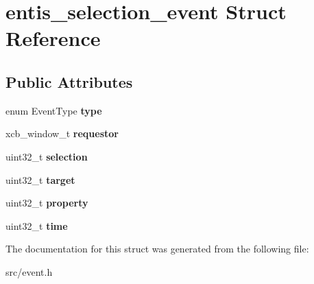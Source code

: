\hypertarget{structentis__selection__event}{}\section{entis\+\_\+selection\+\_\+event Struct Reference}
\label{structentis__selection__event}
\subsection*{Public Attributes}
\begin{DoxyCompactItemize}
\item 
\mbox{\label{structentis__selection__event_a4ea19c642e36c6e18c28fd62271503f9}} 
enum Event\+Type {\bfseries type}
\item 
\mbox{\label{structentis__selection__event_a84947ae6c0fd21f81d68be1622b4fd64}} 
xcb\+\_\+window\+\_\+t {\bfseries requestor}
\item 
\mbox{\label{structentis__selection__event_a1a3a4a9427cd1ede59b33b480749e19a}} 
uint32\+\_\+t {\bfseries selection}
\item 
\mbox{\label{structentis__selection__event_afbd962bddc653fd69d26d6980f53d662}} 
uint32\+\_\+t {\bfseries target}
\item 
\mbox{\label{structentis__selection__event_a21b47f52968ab2c08d10aa7ac55606ca}} 
uint32\+\_\+t {\bfseries property}
\item 
\mbox{\label{structentis__selection__event_a1fe2e2039286aa15f71706ace6d48cc0}} 
uint32\+\_\+t {\bfseries time}
\end{DoxyCompactItemize}


The documentation for this struct was generated from the following file\+:\begin{DoxyCompactItemize}
\item 
src/event.\+h\end{DoxyCompactItemize}
